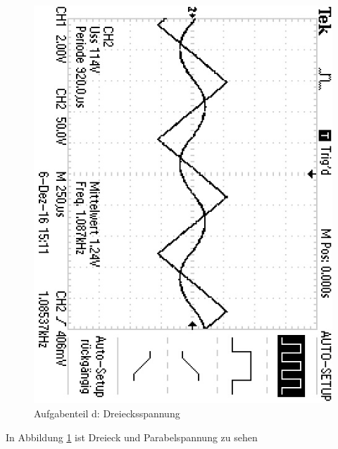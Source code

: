 \begin{figure}
	\centering
	\includegraphics[angle=90]{bilder/ALL0003/F0003TEK.JPG}
	\caption{Aufgabenteil d: Dreiecksspannung}
	\label{fig:dreieck}
\end{figure}

In Abbildung \ref{fig:dreieck} ist Dreieck und Parabelspannung zu sehen


